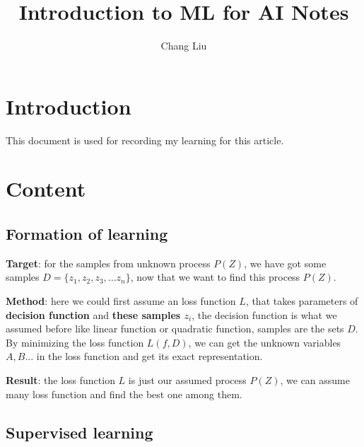 \documentclass{article}
\author{Chang Liu}
\title{Introduction to ML for AI \- Notes}
\begin{document}
\maketitle

\section{Introduction}
This document is used for recording my learning for this article.

\section{Content}

\subsection{Formation of learning}
\textbf{Target}: for the samples from unknown process $P(Z)$, we have got some samples $D=\{z_{1}, z_{2}, z_{3}, ... z_{n}\}$, now that we want to find this process $P(Z)$.\newline

\noindent \textbf{Method}: here we could first assume an loss function $L$, that takes parameters of \textbf{decision function} and \textbf{these samples $z_{i}$}, the decision function is what we assumed before like linear function or quadratic function, samples are the sets $D$. By minimizing the loss function $L(f, D)$, we can get the unknown variables $A, B...$ in the loss function and get its exact representation.\newline

\noindent \textbf{Result}: the loss function $L$ is just our assumed process $P(Z)$, we can assume many loss function and find the best one among them.


\subsection{Supervised learning}



\subsection{}


\subsection{}
\end{document}

